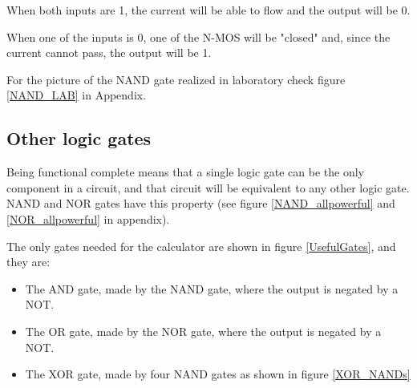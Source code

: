\documentclass{article}
\begin{document}
\vspace{3mm}

When both inputs are 1, the current will be able to flow and the output will be 0.

\vspace{1mm}

When one of the inputs is 0, one of the N-MOS will be "closed" and, since the current cannot pass, the output will be 1.

\vspace{3mm}

For the picture of the NAND gate realized in laboratory check figure \ref{NAND_LAB} in Appendix.



\subsection{Other logic gates} \label{OtherGates}

Being functional complete means that a single logic gate can be the only component in a circuit, and that circuit will be equivalent to any other logic gate. NAND and NOR gates have this property (see figure \ref{NAND_allpowerful} and \ref{NOR_allpowerful} in appendix).

\vspace{3mm}

The only gates needed for the calculator are shown in figure \ref{UsefulGates}, and they are: 

\begin{itemize}
\item The AND gate, made by the NAND gate, where the output is negated by a NOT.
\item The OR gate, made by the NOR gate, where the output is negated by a NOT.
\item The XOR gate, made by four NAND gates as shown in figure \ref{XOR_NANDs}
\end{itemize}
\end{document}
